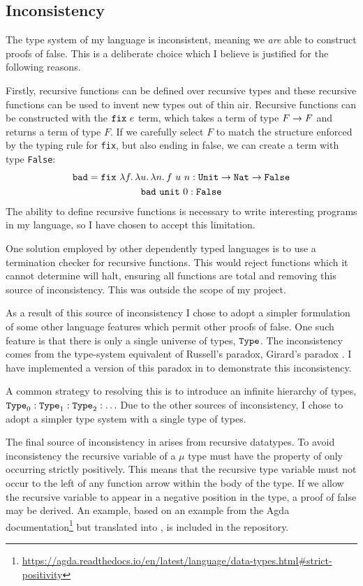 \documentclass[12pt,a4paper,twoside]{report}
\begin{document}
\subsection{Inconsistency}

The type system of my language is inconsistent, meaning we \emph{are} able to construct proofs of false.
This is a deliberate choice which I believe is justified for the following reasons.

Firstly, recursive functions can be defined over recursive types and these recursive functions can be used to invent new types out of thin air.
Recursive functions can be constructed with the \(\mathtt{fix}\ e\) term, which takes a term of type \(F \rightarrow F\) and returns a term of type \(F\).
If we carefully select \(F\) to match the structure enforced by the typing rule for \texttt{fix}, but also ending in false, we can create a term with type \texttt{False}:
\begin{gather*}
    \texttt{bad} = \mathtt{fix}\ \lambda f \ldotp \lambda u \ldotp \lambda n \ldotp f\ u\ n : \mathtt{Unit} \rightarrow \texttt{Nat} \rightarrow \texttt{False} \\
    \texttt{bad}\ \mathtt{unit}\ 0 : \texttt{False}
\end{gather*}
The ability to define recursive functions is necessary to write interesting programs in my language, so I have chosen to accept this limitation.

One solution employed by other dependently typed languages \cite{brady13,norell07} is to use a termination checker for recursive functions.
This would reject functions which it cannot determine will halt, ensuring all functions are total and removing this source of inconsistency.
This was outside the scope of my project.

As a result of this source of inconsistency I chose to adopt a simpler formulation of some other language features which permit other proofs of false.
One such feature is that there is only a single universe of types, \(\mathtt{Type}\).
The inconsistency comes from the type-system equivalent of Russell's paradox, Girard's paradox \cite{girard72}.
I have implemented a version of this paradox in \pimu{} to demonstrate this inconsistency.

A common strategy to resolving this is to introduce an infinite hierarchy of types, \(\mathtt{Type}_0 : \mathtt{Type}_1 : \mathtt{Type}_2 : \ldots\)
Due to the other sources of inconsistency, I chose to adopt a simpler type system with a single type of types.

The final source of inconsistency in \pimu{} arises from recursive datatypes.
To avoid inconsistency the recursive variable of a \(\mu\) type must have the property of only occurring strictly positively.
This means that the recursive type variable must not occur to the left of any function arrow within the body of the type.
If we allow the recursive variable to appear in a negative position in the type, a proof of false may be derived.
An example, based on an example from the Agda documentation\footnote{\url{https://agda.readthedocs.io/en/latest/language/data-types.html\#strict-positivity}} but translated into \pimu{}, is included in the repository.
\end{document}
